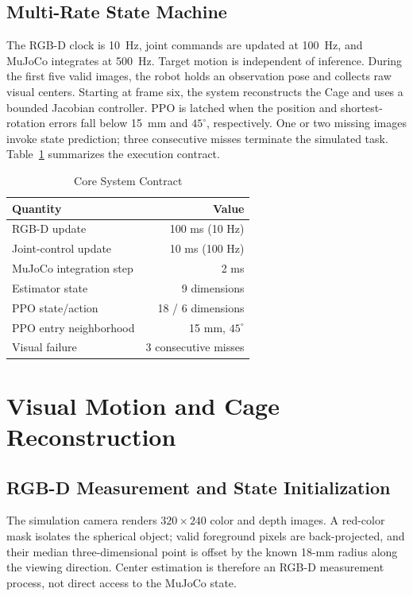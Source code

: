 \documentclass[conference]{IEEEtran}
\begin{document}
\subsection{Multi-Rate State Machine}

The RGB-D clock is 10~Hz, joint commands are updated at 100~Hz, and MuJoCo integrates at 500~Hz. Target motion is independent of inference. During the first five valid images, the robot holds an observation pose and collects raw visual centers. Starting at frame six, the system reconstructs the Cage and uses a bounded Jacobian controller. PPO is latched when the position and shortest-rotation errors fall below 15~mm and $45^{\circ}$, respectively. One or two missing images invoke state prediction; three consecutive misses terminate the simulated task. Table~\ref{tab:system_contract} summarizes the execution contract.

\begin{table}[t]
\caption{Core System Contract}
\label{tab:system_contract}
\centering
\begin{tabular}{lr}
\toprule
Quantity & Value \\
\midrule
RGB-D update & 100 ms (10 Hz) \\
Joint-control update & 10 ms (100 Hz) \\
MuJoCo integration step & 2 ms \\
Estimator state & 9 dimensions \\
PPO state/action & 18 / 6 dimensions \\
PPO entry neighborhood & 15 mm, $45^{\circ}$ \\
Visual failure & 3 consecutive misses \\
\bottomrule
\end{tabular}
\end{table}

\section{Visual Motion and Cage Reconstruction}

\subsection{RGB-D Measurement and State Initialization}

The simulation camera renders $320\times240$ color and depth images. A red-color mask isolates the spherical object; valid foreground pixels are back-projected, and their median three-dimensional point is offset by the known 18-mm radius along the viewing direction. Center estimation is therefore an RGB-D measurement process, not direct access to the MuJoCo state.
\end{document}

